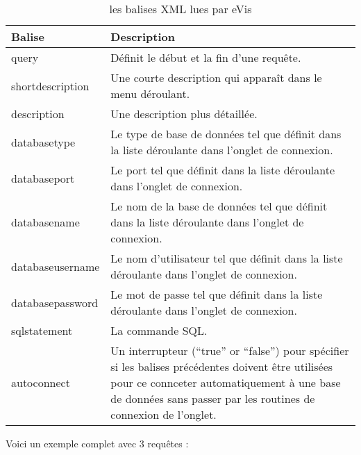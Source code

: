 \begin{table}[htp]
\centering
\caption{les balises XML lues par eVis}\label{tab:evis_xml_tags}\medskip
 \begin{tabular}{|p{1.2in}|p{4.7in}|}
 \hline \textbf{Balise} & \textbf{Description}\\
 \hline query & Définit le début et la fin d'une requête.\\
 \hline shortdescription & Une courte description qui apparaît dans le menu déroulant.\\
 \hline description & Une description plus détaillée.\\
 \hline databasetype & Le type de base de données tel que définit dans la liste déroulante dans l'onglet de connexion.\\
 \hline databaseport & Le port tel que définit dans la liste déroulante dans l'onglet de connexion.\\
 \hline databasename & Le nom de la base de données tel que définit dans la liste déroulante dans l'onglet de connexion.\\
 \hline databaseusername & Le nom d'utilisateur tel que définit dans la liste déroulante dans l'onglet de connexion.\\
 \hline databasepassword & Le mot de passe tel que définit dans la liste déroulante dans l'onglet de connexion.\\
 \hline sqlstatement & La commande SQL.\\
 \hline autoconnect & Un interrupteur (``true'' or ``false'')  pour spécifier si les balises précédentes doivent être utilisées pour ce connceter automatiquement à une base de données sans passer par les routines de connexion de l'onglet.\\
 \hline
\end{tabular}
\end{table}

Voici un exemple complet avec 3 requêtes :

